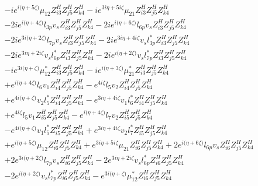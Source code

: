 \begin{align}
 &-i e^{i \Big(\eta +5 \zeta \Big)} \mu_{12} Z_{{i 3}}^{H} Z_{{j 5}}^{H} Z_{{k 4}}^{H} -i e^{3 i \eta +5 i \zeta } \mu_{21} Z_{{i 3}}^{H} Z_{{j 5}}^{H} Z_{{k 4}}^{H} \nonumber \\ 
 &-2 i e^{i \Big(\eta +4 \zeta \Big)} l_{3p} v_s Z_{{i 3}}^{H} Z_{{j 5}}^{H} Z_{{k 4}}^{H} -2 i e^{i \Big(\eta +6 \zeta \Big)} l_{6p} v_s Z_{{i 3}}^{H} Z_{{j 5}}^{H} Z_{{k 4}}^{H} \nonumber \\ 
 &-2 i e^{3 i \Big(\eta +2 \zeta \Big)} l_{7p} v_s Z_{{i 3}}^{H} Z_{{j 5}}^{H} Z_{{k 4}}^{H} -2 i e^{3 i \eta +4 i \zeta } v_s l_{3p}^* Z_{{i 3}}^{H} Z_{{j 5}}^{H} Z_{{k 4}}^{H} \nonumber \\ 
 &-2 i e^{3 i \eta +2 i \zeta } v_s l_{6p}^* Z_{{i 3}}^{H} Z_{{j 5}}^{H} Z_{{k 4}}^{H} -2 i e^{i \Big(\eta +2 \zeta \Big)} v_s l_{7p}^* Z_{{i 3}}^{H} Z_{{j 5}}^{H} Z_{{k 4}}^{H} \nonumber \\ 
 &-i e^{3 i \Big(\eta +\zeta \Big)} \mu_{12}^* Z_{{i 3}}^{H} Z_{{j 5}}^{H} Z_{{k 4}}^{H} -i e^{i \Big(\eta +3 \zeta \Big)} \mu_{21}^* Z_{{i 3}}^{H} Z_{{j 5}}^{H} Z_{{k 4}}^{H} \nonumber \\ 
 &+e^{i \Big(\eta +4 \zeta \Big)} l_6 v_1 Z_{{i 4}}^{H} Z_{{j 5}}^{H} Z_{{k 4}}^{H} - e^{4 i \zeta } l_5 v_2 Z_{{i 4}}^{H} Z_{{j 5}}^{H} Z_{{k 4}}^{H} \nonumber \\ 
 &+e^{4 i \Big(\eta +\zeta \Big)} v_2 l_5^* Z_{{i 4}}^{H} Z_{{j 5}}^{H} Z_{{k 4}}^{H} - e^{3 i \eta +4 i \zeta } v_1 l_6^* Z_{{i 4}}^{H} Z_{{j 5}}^{H} Z_{{k 4}}^{H} \nonumber \\ 
 &+e^{4 i \zeta } l_5 v_1 Z_{{i 5}}^{H} Z_{{j 5}}^{H} Z_{{k 4}}^{H} - e^{i \Big(\eta +4 \zeta \Big)} l_7 v_2 Z_{{i 5}}^{H} Z_{{j 5}}^{H} Z_{{k 4}}^{H} \nonumber \\ 
 &- e^{4 i \Big(\eta +\zeta \Big)} v_1 l_5^* Z_{{i 5}}^{H} Z_{{j 5}}^{H} Z_{{k 4}}^{H} +e^{3 i \eta +4 i \zeta } v_2 l_7^* Z_{{i 5}}^{H} Z_{{j 5}}^{H} Z_{{k 4}}^{H} \nonumber \\ 
 &+e^{i \Big(\eta +5 \zeta \Big)} \mu_{12} Z_{{i 6}}^{H} Z_{{j 5}}^{H} Z_{{k 4}}^{H} +e^{3 i \eta +5 i \zeta } \mu_{21} Z_{{i 6}}^{H} Z_{{j 5}}^{H} Z_{{k 4}}^{H} +2 e^{i \Big(\eta +6 \zeta \Big)} l_{6p} v_s Z_{{i 6}}^{H} Z_{{j 5}}^{H} Z_{{k 4}}^{H} \nonumber \\ 
 &+2 e^{3 i \Big(\eta +2 \zeta \Big)} l_{7p} v_s Z_{{i 6}}^{H} Z_{{j 5}}^{H} Z_{{k 4}}^{H} -2 e^{3 i \eta +2 i \zeta } v_s l_{6p}^* Z_{{i 6}}^{H} Z_{{j 5}}^{H} Z_{{k 4}}^{H} \nonumber \\ 
 &-2 e^{i \Big(\eta +2 \zeta \Big)} v_s l_{7p}^* Z_{{i 6}}^{H} Z_{{j 5}}^{H} Z_{{k 4}}^{H} - e^{3 i \Big(\eta +\zeta \Big)} \mu_{12}^* Z_{{i 6}}^{H} Z_{{j 5}}^{H} Z_{{k 4}}^{H} \nonumber \\ 

\end{align}
